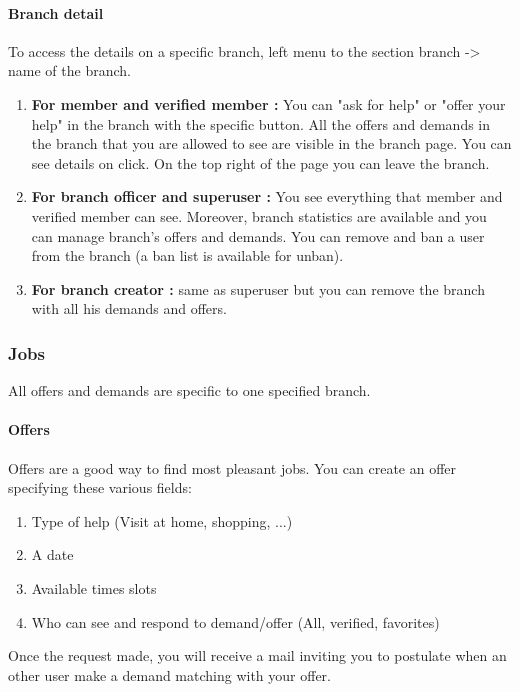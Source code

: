 \documentclass[11pt, a4paper]{article}   	%
\begin{document}
\paragraph{Branch detail}
To access the details on a specific branch, left menu to the section branch -> name of the branch.
\begin{enumerate}
	\item \textbf{For member and verified member :} You can "ask for help" or "offer your help" in the branch with the specific button. All the offers and demands in the branch that you are allowed to see are visible in the branch page.
You can see details on click.
On the top right of the page you can leave the branch.
	\item \textbf{For branch officer and superuser :} You see everything that member and verified member can see. Moreover, branch statistics are available and you can manage branch's offers and demands. You can remove and ban a user from the branch (a ban list is available for unban).
	\item \textbf{For branch creator :} same as superuser but you can remove the branch with all his demands and offers.
\end{enumerate}

\subsubsection{Jobs}

All offers and demands are specific to one specified branch. 

\paragraph{Offers}
Offers are a good way to find most pleasant jobs. 
You can create an offer specifying these various fields:
\begin{enumerate}
	\item Type of help (Visit at home, shopping, ...)
	\item A date
	\item Available times slots
	\item Who can see and respond to demand/offer (All, verified, favorites)
\end{enumerate}
Once the request made, you will receive a mail inviting you to postulate when an other user make a demand matching with your offer. 
\end{document}
